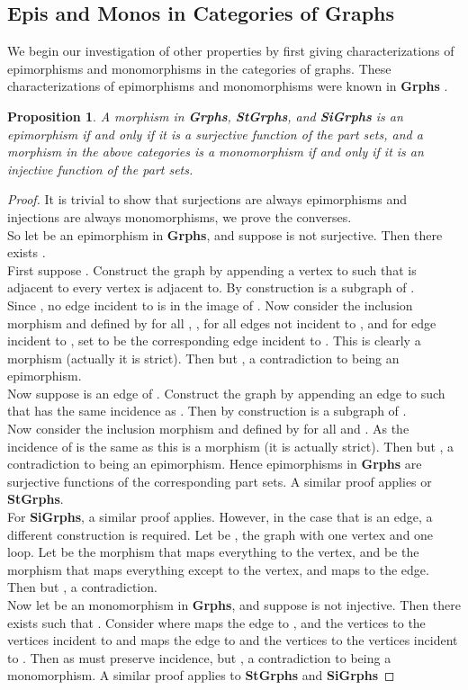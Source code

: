 \documentclass[11pt]{article}
\newtheorem{proposition}[theorem]{Proposition}
\begin{document}
\subsection{Epis and Monos in Categories of Graphs}
\indent We begin our investigation of other properties by first giving characterizations of epimorphisms and monomorphisms in the categories of graphs. These characterizations of epimorphisms and monomorphisms were known in \textbf{Grphs} \cite{KKWil}.
\begin{proposition}
A morphism in \textbf{Grphs}, \textbf{StGrphs}, and \textbf{SiGrphs} is an epimorphism if and only if it is a surjective function of the part sets, and a morphism in the above categories is a monomorphism if and only if it is an injective function of the part sets.
\end{proposition}
\begin{proof}
It is trivial to show that surjections are always epimorphisms and injections are always monomorphisms, we prove the converses.\\
\indent So let  be an epimorphism in \textbf{Grphs}, and suppose  is not surjective. Then there exists .\\
\indent First suppose . Construct the graph  by appending a vertex  to  such that  is adjacent to every vertex  is adjacent to. By construction  is a subgraph of .\\
\indent Since , no edge incident to  is in the image of . Now consider  the inclusion morphism and  defined by  for all , ,  for all edges  not incident to , and for edge  incident to , set  to be the corresponding edge incident to . This is clearly a morphism (actually it is strict). Then  but , a contradiction to  being an epimorphism.\\
\indent Now suppose  is an edge of . Construct the graph  by appending an edge  to  such that  has the same incidence as . Then by construction  is a subgraph of .\\
\indent Now consider  the inclusion morphism and  defined by  for all  and . As the incidence of  is the same as  this is a morphism (it is actually strict). Then  but , a contradiction to  being an epimorphism. Hence epimorphisms in \textbf{Grphs} are surjective functions of the corresponding part sets. A similar proof applies or \textbf{StGrphs}.\\
\indent For \textbf{SiGrphs}, a similar proof applies. However, in the case that  is an edge, a different construction is required. Let  be , the graph with one vertex and one loop. Let  be the morphism that maps everything to the vertex, and  be the morphism that maps everything except  to the vertex, and maps  to the edge. Then  but , a contradiction.\\
\indent Now let  be an monomorphism in \textbf{Grphs}, and suppose  is not injective. Then there exists  such that . Consider  where  maps the edge to , and the vertices to the vertices incident to  and  maps the edge to  and the vertices to the vertices incident to . Then as  must preserve incidence,  but , a contradiction to  being a monomorphism. A similar proof applies to \textbf{StGrphs} and \textbf{SiGrphs}
\end{proof}
\end{document}
